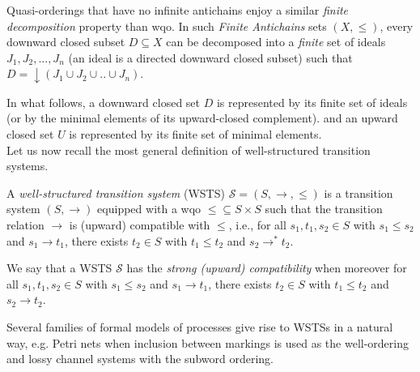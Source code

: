 \noindent
Quasi-orderings that have no infinite antichains enjoy a similar \emph{finite decomposition} property than wqo. In such \emph{Finite Antichains} sets $(X,\leq)$, every downward closed subset $D \subseteq X$ can be decomposed into a \emph{finite} set of ideals $J_1, J_2,..., J_n$ (an ideal is a directed downward closed subset) such that $D = \downarrow (J_1 \cup J_2 \cup..\cup J_n)$.

In what follows, a downward closed set $D$ is represented by its finite set of ideals (or by the minimal elements of its upward-closed complement).
and an upward closed set $U$ is represented by its finite set of minimal elements. \\

\noindent
Let us now recall the most general definition of well-structured transition systems.

\begin{definition}\cite{DBLP:journals/iandc/Finkel90,DBLP:journals/tcs/FinkelS01}
A {\em well-structured transition system} (WSTS)  $\mathscr{S}=(S, \rightarrow, \leq)$
is a transition system $(S, \rightarrow)$
equipped with a wqo ${\leq} \subseteq S \times S$ such that  
the transition relation $ \rightarrow$ is (upward) compatible with $\leq$, i.e., for all 
$s_1, t_1 , s_2 \in S$
	with $s_1 \leq s_2$  and $s_1 \rightarrow t_1$, there exists 
	$t_2 \in S$ with 
	$t_1 \leq t_2$ and $s_2 \rightarrow^{*} t_2$.
\end{definition}

We say that a WSTS $\mathscr{S}$ has the \emph{strong (upward) compatibility} when moreover for all 
$s_1, t_1 , s_2 \in S$
	with $s_1 \leq s_2$  and $s_1 \rightarrow t_1$, there exists 
	$t_2 \in S$ with 
	$t_1 \leq t_2$ and $s_2 \rightarrow t_2$.

Several families of formal models of processes give rise to WSTSs in a natural way, e.g. Petri nets when inclusion between markings is used as the well-ordering and lossy channel systems with the subword ordering.


\iffalse
\begin{proposition}\cite{DBLP:journals/tcs/FinkelS01}
If $\mathscr{S}$ is an WSTS and $U \subseteq S$ is an upward-closed set of states, then $\pred^*(U )$ is upward-
closed.
\end{proposition}
%
Proof. Assume $s \in \pred^* (U )$. Then $s \rightarrow^* t$ for some $t \in U $. If now $s' \geq s$ then upward-compatibility entails that $s' \rightarrow^* t'$ for some $t' \geq t$. Then $t' \in U$ and $s' \in \pred^*(U )$.
\fi


